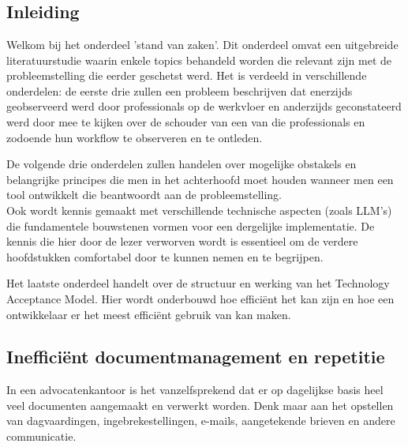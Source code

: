 \chapter{}%
\label{ch:stand-van-zaken}



\section{Inleiding}
Welkom bij het onderdeel 'stand van zaken'. 
Dit onderdeel omvat een uitgebreide literatuurstudie waarin enkele topics behandeld worden die relevant zijn met de probleemstelling die eerder geschetst werd. 
Het is verdeeld in verschillende onderdelen: de eerste drie zullen een probleem beschrijven dat enerzijds geobserveerd werd door professionals op de 
werkvloer en anderzijds geconstateerd werd door mee te kijken over de schouder van een van die professionals en zodoende hun workflow te observeren en te ontleden. 

De volgende drie onderdelen zullen handelen over mogelijke obstakels en belangrijke principes die men in het achterhoofd moet houden wanneer men een tool ontwikkelt die beantwoordt aan de probleemstelling.\\ 

Ook wordt kennis gemaakt met verschillende technische aspecten (zoals \Gls{LLM}'s) die fundamentele bouwstenen vormen voor een dergelijke implementatie. 
De kennis die hier door de lezer verworven wordt is essentieel om de verdere hoofdstukken comfortabel door te kunnen nemen en te begrijpen. 

Het laatste onderdeel handelt over de structuur en werking van het Technology Acceptance Model. 
Hier wordt onderbouwd hoe efficiënt het kan zijn en hoe een ontwikkelaar er het meest efficiënt gebruik van kan maken.

\newpage


\section{Inefficiënt documentmanagement en repetitie}
In een advocatenkantoor is het vanzelfsprekend dat er op dagelijkse basis heel veel documenten aangemaakt en verwerkt worden.
Denk maar aan het opstellen van dagvaardingen, ingebrekestellingen, e-mails, aangetekende brieven en andere communicatie.

